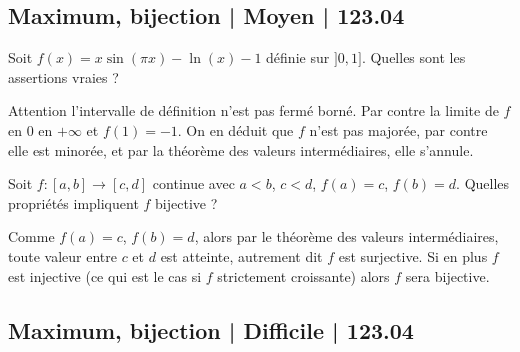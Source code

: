 \subsection{Maximum, bijection | Moyen | 123.04}



\begin{question}
Soit $f(x) = x \sin(\pi x) - \ln(x) - 1$ définie sur $]0,1]$.
Quelles sont les assertions vraies ?
\begin{answers}



    \good{Il existe $c \in ]0,1]$ tel que $f(c)=0$.} 
\end{answers}
\begin{explanations}
Attention l'intervalle de définition n'est pas fermé borné. Par contre la limite de $f$ en $0$ en $+\infty$ et $f(1) = -1$. On en déduit que $f$ n'est pas majorée, par contre elle est minorée, et par la théorème des valeurs intermédiaires, elle s'annule.
\end{explanations}
\end{question}


\begin{question}
Soit $f : [a,b] \to [c,d]$ continue avec $a < b$, $c < d$, $f(a)=c$, $f(b)=d$. Quelles propriétés impliquent $f$ bijective ?
\begin{answers}



\end{answers}
\begin{explanations}
Comme $f(a)=c$, $f(b)=d$, alors par le théorème des valeurs intermédiaires, toute valeur entre $c$ et $d$ est atteinte, autrement dit $f$ est surjective. 
Si en plus $f$ est injective (ce qui est le cas si $f$ strictement croissante) alors $f$ sera bijective.
\end{explanations}
\end{question}




\subsection{Maximum, bijection | Difficile | 123.04}



